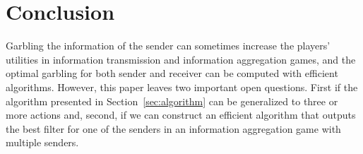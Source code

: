 \documentclass[submission,copyright,creativecommons]{eptcs}
\begin{document}
\section{Conclusion}\label{sec:conclusion}

Garbling the information of the sender can sometimes increase the players' utilities in information transmission and information aggregation games, and the optimal garbling for both sender and receiver can be computed with efficient algorithms. However, this paper leaves two important open questions. First if the algorithm presented in Section~\ref{sec:algorithm} can be generalized to three or more actions and, second, if we can construct an efficient algorithm that outputs the best filter for one of the senders in an information aggregation game with multiple senders.



\end{document}
